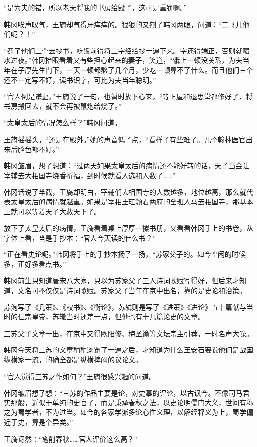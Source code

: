 “是为夫的错，所以老天将我的书房给毁了，这可是重罚啊。”

韩冈唉声叹气，王旖却气得牙痒痒的。狠狠的又剜了韩冈两眼，问道：“二哥儿他们呢？！”

“罚了他们三个去抄书，吃饭前得将三字经给抄一遍下来。字还得端正，否则就喝水过夜。”韩冈抬眼看着又有些担心起来的妻子，笑道，“饿上一顿没关系，为夫当年在子厚先生门下，一天一顿都熬了几个月，少吃一顿算不了什么。而且他们三个还不一定写不好，读书识字，可比为夫当年聪明。”

“官人倒是谦虚。”王旖说了一句，也暂时放下心来，“等正屋和退思堂都修好了，将书房搬回去，就不会再被鞭炮给烧了。”

“太皇太后的情况怎么样？”韩冈问道。

王旖摇摇头，“还是在殿外。”她的声音低了点，“看样子有些难了。几个翰林医官出来后脸色都不好。”

韩冈皱眉，想了想道：“过两天如果太皇太后的病情还不能好转的话，天子当会让宰辅去大相国寺烧香祈福，到时候就看人选和人数了……”

韩冈话说了半截，王旖却明白，宰辅们去相国寺的人数越多，地位越高，那么就代表太皇太后的病情就越重。如果是宰相王珪领着两府的全班人马去相国寺，那基本上就可以等着天子大赦天下了。

放下了太皇太后的病情，王旖看着桌上厚厚一摞书册，又看看韩冈手上的书卷，从字体上看，当是手抄本：“官人今天读的什么书？”

“正在看史论呢。”韩冈将手上的手抄本扬了一扬，“苏家父子的。如今空闲的时候多，正好多看点书。”

韩冈前生只知道唐宋八大家，只以为苏家父子三人诗词歌赋写得好，但后来才知道，文名可不仅仅是诗词歌赋。苏家父子当年在京中出名，靠的是史论和治策。

苏洵写了《几策》、《权书》、《衡论》，苏轼则是写了《进策》《进论》五十篇献与当时的仁宗皇帝，苏辙当时还差一点，但他也有十几篇论史的文章。

三苏父子文章一出，在京中又得欧阳修、梅圣谕等文坛宗主引荐，一时名声大噪。

韩冈今天将三苏的文章稍稍浏览了一遍之后，才知道为什么王安石要说他们是战国纵横家一流，的确全都是纵横捭阖的议论文。

“官人觉得三苏之作如何？”王旖很感兴趣的问道。

韩冈皱眉想了想：“三苏的作品主要是论，对史事的评论，以古讽今。不像司马君实那般，近似于单纯的史官了，而是秉承春秋之法，以史论明儒门大义，世间有称之为蜀学者，不为过当。如今的各家学派多论心性义理，以解经释义为上，蜀学偏近于史，算是个异类。”

王旖讶然：“笔削春秋……官人评价这么高？”

